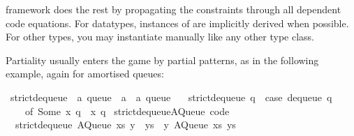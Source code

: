\begin{isabellebody}
\begin{isamarkuptext}
  framework does the rest by propagating the  constraints
  through all dependent code equations.  For datatypes, instances of
   are implicitly derived when possible.  For other types,
  you may instantiate  manually like any other type class.%
\end{isamarkuptext}%
\isamarkuptrue%
%
\isamarkuptrue%
%
\begin{isamarkuptext}%
Partiality usually enters the game by partial patterns, as
  in the following example, again for amortised queues:%
\end{isamarkuptext}%
\isamarkuptrue%
%
\isadelimquote
%
\endisadelimquote
%
\isatagquote
{}\isamarkupfalse%
\ strict{}dequeue\ {}{}\ {}{}a\ queue\ {}\ {}a\ {}\ {}a\ queue{}\ \isanewline
\ \ {}strict{}dequeue\ q\ {}\ {}case\ dequeue\ q\isanewline
\ \ \ \ of\ {}Some\ x{}\ q{}{}\ {}\ {}x{}\ q{}{}{}{}\isanewline
\isanewline
{}\isamarkupfalse%
\ strict{}dequeue{}AQueue\ {}code{}{}\isanewline
\ \ {}strict{}dequeue\ {}AQueue\ xs\ {}y\ {}\ ys{}{}\ {}\ {}y{}\ AQueue\ xs\ ys{}{}\isanewline

\end{isabellebody}
